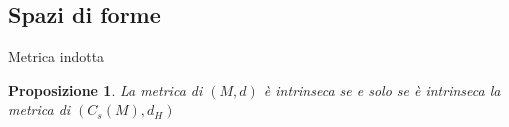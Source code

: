 \documentclass{beamer}
\newcounter{counter1}
\theoremstyle{plain}
\newtheorem{mypro}[counter1]{Proposizione}
\theoremstyle{definition}
\newtheorem{myes}[counter1]{Esempio}
\theoremstyle{remark}
\newcommand{\obar}[1]{\overline{#1}}
\newcommand{\set}[1]{\left\{#1\right\}}
\newcommand{\bra}[1]{\left[#1\right]}
\newcommand{\abs}[1]{\left|#1\right|}
\DeclareMathOperator{\len}{len}
\begin{document}

\subsection{Spazi di forme}

\begin{frame}{Metrica indotta}
  \begin{mypro}
    La metrica di $(M,d)$ è intrinseca se e solo se è intrinseca la
    metrica di $(C_s(M),d_H)$
  \end{mypro}
\end{frame}



\end{document}
